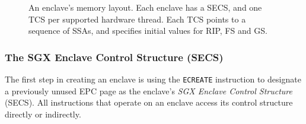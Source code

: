\begin{figure}[hbt!]
  \caption{
    An enclave's memory layout. Each enclave has a SECS, and one TCS per
    supported hardware thread. Each TCS points to a sequence of SSAs, and
    specifies initial values for RIP, FS and GS.
  }
  \label{fig:enclave_layout}
\end{figure}

\subsubsection{The SGX Enclave Control Structure (SECS)}
\label{sec:secs}


The first step in creating an enclave is using the \texttt{ECREATE} instruction
to designate a previously unused EPC page as the enclave's \textit{SGX Enclave
Control Structure} (SECS). All instructions that operate on an enclave access
its control structure directly or indirectly.

